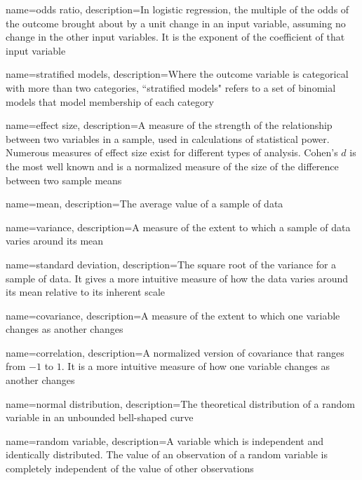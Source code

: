 {
    name={odds ratio},
    description={In logistic regression, the multiple of the odds of the outcome brought about by a unit change in an input variable, assuming no change in the other input variables.  It is the exponent of the coefficient of that input variable}
}

{
    name={stratified models},
    description={Where the outcome variable is categorical with more than two categories, ``stratified models" refers to a set of binomial models that model membership of each category}
}

{
    name={effect size},
    description={A measure of the strength of the relationship between two variables in a sample, used in calculations of statistical power.  Numerous measures of effect size exist for different types of analysis.  Cohen's $d$ is the most well known and is a normalized measure of the size of the difference between two sample means}
}

{
    name={mean},
    description={The average value of a sample of data}
}

{
    name={variance},
    description={A measure of the extent to which a sample of data varies around its mean}
}

{
    name={standard deviation},
    description={The square root of the variance for a sample of data.  It gives a more intuitive measure of how the data varies around its mean relative to its inherent scale}
}

{
    name={covariance},
    description={A measure of the extent to which one variable changes as another changes}
}

{
    name={correlation},
    description={A normalized version of covariance that ranges from $-1$ to $1$.  It is a more intuitive measure of how one variable changes as another changes}
}

{
    name={normal distribution},
    description={The theoretical distribution of a random variable in an unbounded bell-shaped curve}
}

{
    name={random variable},
    description={A variable which is independent and identically distributed.  The value of an observation of a random variable is completely independent of the value of other observations}
}

